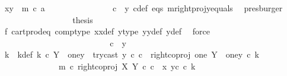 \begin{isabellebody}
\ {\isachardoublequoteopen}{\isasymlangle}x{}{\isacharcomma}{\kern0pt}y{}{\isasymrangle}\ {\isacharequal}{\kern0pt}\ m\ {\isasymcirc}\isactrlsub c\ a{\isachardoublequoteclose}\isanewline
\ \ \ \ \ \ \ \ \ \ \ \ \ \ \isamarkupfalse%
\ {\isacartoucheopen}c\ {\isacharequal}{\kern0pt}\ y{}{\isacartoucheclose}\ c{\isacharunderscore}{\kern0pt}def\ eqs\ m{\isacharunderscore}{\kern0pt}rightproj{\isacharunderscore}{\kern0pt}y{}{\isacharunderscore}{\kern0pt}equals\ \isamarkupfalse%
\ presburger\isanewline
\ \ \ \ \ \ \ \ \ \ \ \ \ \ \isamarkupfalse%
\ \isamarkupfalse%
\ {\isacharquery}{\kern0pt}thesis\isanewline
\ \ \ \ \ \ \ \ \ \ \ \ \ \ \isamarkupfalse%
\ f{}\ cart{\isacharunderscore}{\kern0pt}prod{\isacharunderscore}{\kern0pt}eq{}\ comp{\isacharunderscore}{\kern0pt}type\ x{}x{}{\isacharunderscore}{\kern0pt}def\ y{}{\isacharprime}{\kern0pt}{\isacharunderscore}{\kern0pt}type\ y{}y{}{\isacharunderscore}{\kern0pt}def{\isacharparenleft}{\kern0pt}{}{\isacharparenright}{\kern0pt}\ y{\isacharunderscore}{\kern0pt}def\ \isamarkupfalse%
\ force\isanewline
\ \ \ \ \ \ \ \ \ \ \ \ \ \ \isamarkupfalse%
\isanewline
\ \ \ \ \ \ \ \ \ \ \isamarkupfalse%
\isanewline
\ \ \ \ \ \ \ \ \ \ \ \ \ \ \isamarkupfalse%
\ {\isachardoublequoteopen}c\ {\isasymnoteq}\ y{}{\isachardoublequoteclose}\ \ \ \ \ \ \ \ \ \ \ \ \ \ \isanewline
\ \ \ \ \ \ \ \ \ \ \ \ \ \ \isamarkupfalse%
\ \isamarkupfalse%
\ k{\isacharprime}{\kern0pt}\ \ k{\isacharprime}{\kern0pt}{\isacharunderscore}{\kern0pt}def{\isacharcolon}{\kern0pt}\ {\isachardoublequoteopen}k{\isacharprime}{\kern0pt}\ {\isasymin}\isactrlsub c\ Y\ {\isasymsetminus}\ {\isacharparenleft}{\kern0pt}one{\isacharcomma}{\kern0pt}y{}{\isacharparenright}{\kern0pt}\ {\isasymand}\ try{\isacharunderscore}{\kern0pt}cast\ y{}\ {\isasymcirc}\isactrlsub c\ c\ {\isacharequal}{\kern0pt}\ right{\isacharunderscore}{\kern0pt}coproj\ one\ {\isacharparenleft}{\kern0pt}Y\ {\isasymsetminus}\ {\isacharparenleft}{\kern0pt}one{\isacharcomma}{\kern0pt}y{}{\isacharparenright}{\kern0pt}{\isacharparenright}{\kern0pt}\ {\isasymcirc}\isactrlsub c\ k{\isacharprime}{\kern0pt}\ {\isasymand}\ \isanewline
\ \ \ \ \ \ \ \ \ \ \ \ \ \ m\ {\isasymcirc}\isactrlsub c\ right{\isacharunderscore}{\kern0pt}coproj\ X\ Y\ {\isasymcirc}\isactrlsub c\ c\ {\isacharequal}{\kern0pt}\ {\isasymlangle}x{}{\isacharcomma}{\kern0pt}\ y{}\isactrlsup c\ {\isasymcirc}\isactrlsub c\ k{\isacharprime}{\kern0pt}{\isasymrangle}{\isachardoublequoteclose}\isanewline

\end{isabellebody}
